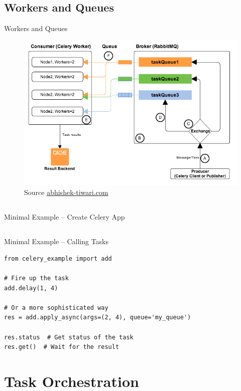 \documentclass[xcolor=x11names,compress,t]{beamer}
\renewcommand{\(}{\begin{columns}[T]}
\renewcommand{\)}{\end{columns}}
\newcommand{\<}[1]{\begin{column}{#1}}
\renewcommand{\>}{\end{column}}
\newenvironment{slide}[1]{\subsection{#1} \begin{frame}{#1}}{\end{frame}}
\begin{document}
\begin{slide}{Workers and Queues}
    \begin{figure}
        \includegraphics[scale=0.45]{celery-queues-and-workers}
        \caption{Source \href{https://abhishek-tiwari.com/post/amqp-rabbitmq-and-celery-a-visual-guide-for-dummies}{abhishek-tiwari.com}}
    \end{figure}
\end{slide} 

\subsection{}
\begin{frame}[fragile]{Minimal Example -- Create Celery App}
\end{frame}

\subsection{}
\begin{frame}[fragile]{Minimal Example -- Calling Tasks}
\begin{verbatim}
from celery_example import add

# Fire up the task
add.delay(1, 4)

# Or a more sophisticated way
res = add.apply_async(args=(2, 4), queue='my_queue')

res.status  # Get status of the task
res.get()  # Wait for the result
\end{verbatim}
\end{frame}

\section{Task Orchestration}
\end{document}
